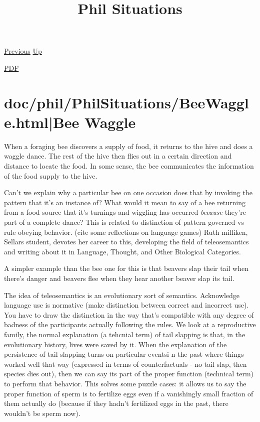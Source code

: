 \documentclass[12pt,a4paper]{report}
\begin{document}
 \href{doc/phil/PhilProblems.html}{Previous} 
 \href{doc/phil.html}{Up} 

 \href{doc/phil/PhilSituations.pdf}{PDF} 
\title{Phil Situations}

\tableofcontents

\part{doc/phil/PhilSituations/BeeWaggle.html|Bee Waggle}
When a foraging bee discovers a supply of food, it returns to the hive and does
a waggle dance. The rest of the hive then flies out in a certain direction and
distance to locate the food. In some sense, the bee communicates the information
of the food supply to the hive.

Can't we explain why a particular bee on one
occasion does that by invoking the pattern that
it's an instance of? What would it mean to say of
a bee returning from a food source that it's
turnings and wiggling has occurred \emph{because}
they're part of a complete dance? This is related
to distinction of pattern governed vs rule
obeying behavior. (cite some reflections on
language games) Ruth milliken, Sellars student,
devotes her career to this, developing the field
of teleosemantics and writing about it in
Language, Thought, and Other Biological
Categories.

A simpler example than the bee one for this is
that beavers slap their tail when there's danger
and beavers flee when they hear another beaver
slap its tail.

The idea of teleosemantics is an evolutionary
sort of semantics. Acknowledge language use is
normative (make distinction between correct and
incorrect use). You have to draw the distinction
in the way that's compatible with any degree of
badness of the participants actually following
the rules. We look at a reproductive family, the
normal explanation (a tehcnial term) of tail
slapping is that, in the evolutionary history,
lives were saved by it. When the explanation of
the persistence of tail slapping turns on
particular eventsi n the past where things worked
well that way (expressed in terms of
counterfactuals - no tail slap, then species dies
out), then we can say its part of the proper
function (technical term) to perform that
behavior. This  solves some puzzle cases: it
allows us to say the proper function of sperm is
to fertilize eggs even if a vanishingly small
fraction of them actually do (because if they
hadn't fertilized eggs in the past, there
wouldn't be sperm now).
\end{document}
